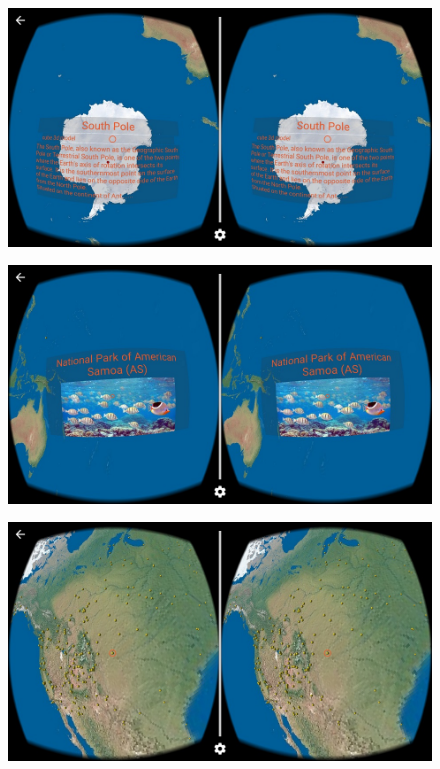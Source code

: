 \begin{figure}[H]
	\centering
	\includegraphics[width=\linewidth, keepaspectratio]{Figures/Screenshots/device-2016-10-28-012336.jpg}
	\decoRule
\end{figure}

\begin{figure}[H]
	\centering
	\includegraphics[width=\linewidth, keepaspectratio]{Figures/Screenshots/device-2016-10-28-012548.jpg}
	\decoRule
\end{figure}

\begin{figure}[H]
	\centering
	\includegraphics[width=\linewidth, keepaspectratio]{Figures/Screenshots/device-2016-10-28-012642.jpg}
	\decoRule
\end{figure}

